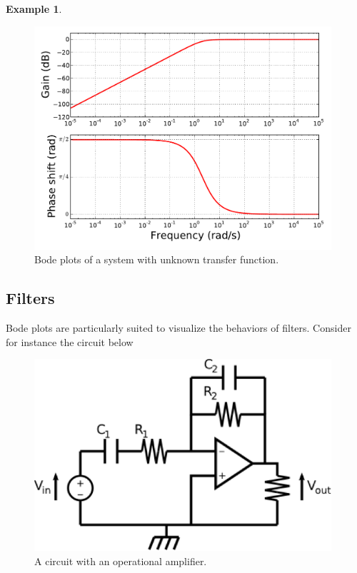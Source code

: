 \documentclass[a4paper,11pt]{report}
\theoremstyle{definition}
\newtheorem{mdexample}{Example}
\newenvironment{example}%
  {\vspace{0.1cm}\begin{mdframed}[backgroundcolor=lightgray]\begin{mdexample}}%
  {\end{mdexample}\end{mdframed}\vspace{0.1cm}}
\begin{document}
\begin{example}
  \begin{figure}[H]
    \centering
    \includegraphics[width=11cm]{fig/exbode.pdf}
    \caption{Bode plots of a system with unknown transfer function.}
    \label{fig:exbode}
  \end{figure}

\end{example}


\subsection{Filters}

Bode plots are particularly suited to visualize the behaviors of
filters. Consider for instance the circuit below

  \begin{figure}[H]
    \centering
    \includegraphics[width=11cm]{fig/circuit.png}
    \caption{A circuit with an operational amplifier.}
    \label{fig:circuit}
  \end{figure}
\end{document}
